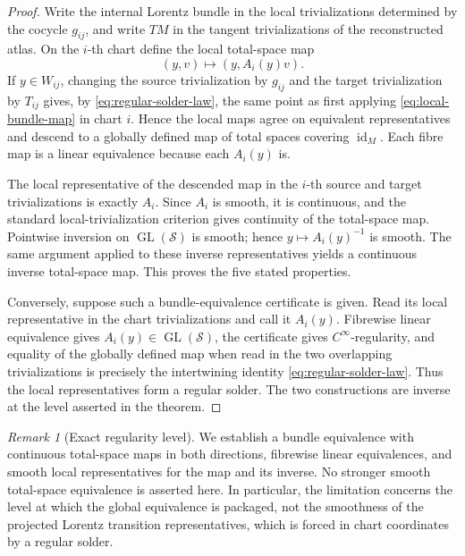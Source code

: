 \documentclass[11pt,a4paper]{article}
\theoremstyle{definition}
\theoremstyle{remark}
\newtheorem{remark}[theorem]{Remark}
\newcommand{\Smodel}{\mathcal{S}}
\newcommand{\GL}{\operatorname{GL}}
\newcommand{\id}{\operatorname{id}}
\begin{document}
\begin{proof}
Write the internal Lorentz bundle in the local trivializations determined by
the cocycle \(g_{ij}\), and write \(TM\) in the tangent trivializations of
the reconstructed atlas.  On the \(i\)-th chart define the local total-space
map
\[
   (y,v)\longmapsto (y,A_i(y)v).
\tag{7.4a}\label{eq:local-bundle-map}
\]
If \(y\in W_{ij}\), changing the source trivialization by \(g_{ij}\) and
the target trivialization by \(T_{ij}\) gives, by
\eqref{eq:regular-solder-law}, the same point as first applying
\eqref{eq:local-bundle-map} in chart \(i\).  Hence the local maps agree on
equivalent representatives and descend to a globally defined map of total
spaces covering \(\id_M\).  Each fibre map is a linear equivalence because
each \(A_i(y)\) is.

The local representative of the descended map in the \(i\)-th source and
target trivializations is exactly \(A_i\).  Since \(A_i\) is smooth, it is
continuous, and the standard local-trivialization criterion gives
continuity of the total-space map.  Pointwise inversion on
\(\GL(\Smodel)\) is smooth; hence \(y\mapsto A_i(y)^{-1}\) is smooth.  The
same argument applied to these inverse representatives yields a continuous
inverse total-space map.  This proves the five stated properties.

Conversely, suppose such a bundle-equivalence certificate is given.  Read
its local representative in the chart trivializations and call it
\(A_i(y)\).  Fibrewise linear equivalence gives
\(A_i(y)\in\GL(\Smodel)\), the certificate gives \(C^\infty\)-regularity,
and equality of the globally defined map when read in the two overlapping
trivializations is precisely the intertwining identity
\eqref{eq:regular-solder-law}.  Thus the local representatives form a
regular solder.  The two constructions are inverse at the level asserted
in the theorem.
\end{proof}

\begin{remark}[Exact regularity level]
We establish a bundle equivalence with continuous total-space maps in both
directions, fibrewise linear equivalences, and smooth local representatives
for the map and its inverse.  No stronger smooth total-space equivalence is
asserted here.  In particular, the limitation concerns the level at which the
global equivalence is packaged, not the smoothness of the projected Lorentz
transition representatives, which is forced in chart coordinates by a
regular solder.
\end{remark}
\end{document}
